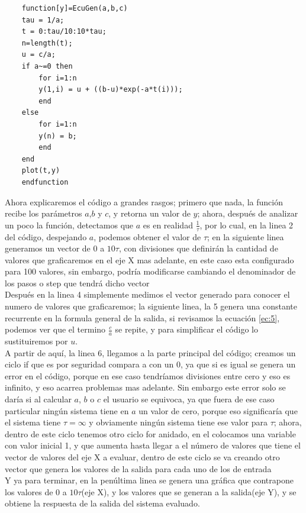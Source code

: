 \documentclass[letterpaper,spanish,12pt]{report}
\begin{document}
	\lstset{language=Scilab, breaklines=true, basicstyle=\footnotesize}
	\lstset{numbers=left, numberstyle=\tiny, stepnumber=1, numbersep=-30pt, frame=single}
	\begin{lstlisting} 
	function[y]=EcuGen(a,b,c)
	tau = 1/a;
	t = 0:tau/10:10*tau;
	n=length(t);
	u = c/a;
	if a~=0 then
		for i=1:n
		y(1,i) = u + ((b-u)*exp(-a*t(i)));
		end
	else
		for i=1:n
		y(n) = b;
		end
	end
	plot(t,y)
	endfunction
	\end{lstlisting}

Ahora explicaremos el c\'odigo a grandes rasgos; primero que nada, la funci\'on recibe los par\'ametros $a$,$b$ y $c$, y retorna un valor de $y$; ahora, despu\'es de analizar un poco la funci\'on, detectamos que $a$ es en realidad $\frac {1} {\tau}$, por lo cual, en la linea 2 del c\'odigo, despejando $a$, podemos obtener el valor de $\tau$; en la siguiente linea generamos un vector de 0 a $10\tau$, con divisiones que definir\'an la cantidad de valores que graficaremos en el eje X mas adelante, en este caso esta configurado para 100 valores, sin embargo, podr\'ia modificarse cambiando el denominador de los pasos o step que tendr\'a dicho vector\medskip \\Despu\'es en la linea 4 simplemente medimos el vector generado para conocer el numero de valores que graficaremos; la siguiente linea, la 5 genera una constante recurrente en la formula general de la salida, si revisamos la ecuaci\'on \ref{ec:5}, podemos ver que el termino $\frac {c} {a}$ se repite, y para simplificar el c\'odigo lo sustituiremos por $u$.\medskip \\A partir de aqu\'i, la linea 6, llegamos a la parte principal del c\'odigo; creamos un ciclo if que es por seguridad compara a con un 0, ya que si es igual se genera un error en el c\'odigo, porque en ese caso tendr\'iamos divisiones entre cero y eso es infinito, y eso acarrea problemas mas adelante. Sin embargo este error solo se dar\'ia si al calcular $a$, $b$ o $c$ el usuario se equivoca, ya que fuera de ese caso particular ning\'un sistema tiene en $a$ un valor de cero, porque eso significar\'ia que el sistema tiene $\tau = \infty$ y obviamente ning\'un sistema tiene ese valor para $\tau$; ahora, dentro de este ciclo tenemos otro ciclo for anidado, en el colocamos una variable con valor inicial 1, y que aumenta hasta llegar a el n\'umero de valores que tiene el vector de valores del eje X a evaluar, dentro de este ciclo se va creando otro vector que genera los valores de la salida para cada uno de los de entrada\medskip \\Y ya para terminar, en la pen\'ultima linea se genera una gr\'afica que contrapone los valores de 0 a $10\tau$(eje X), y los valores que se generan a la salida(eje Y), y se obtiene la respuesta de la salida del sistema evaluado.
\end{document}
